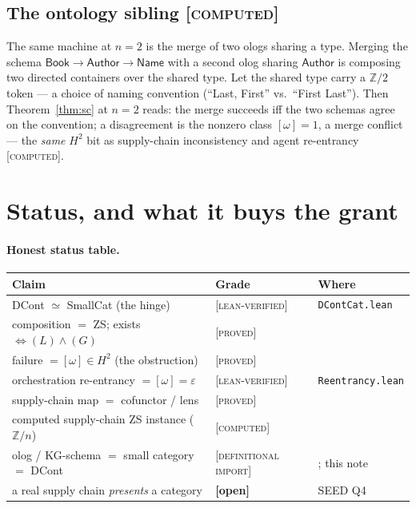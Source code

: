 \documentclass[11pt]{article}
\theoremstyle{definition}
\newcommand{\Zn}{\mathbb{Z}/n}
\newcommand{\Ztwo}{\mathbb{Z}/2}
\newcommand{\gLean}{\textsc{[lean-verified]}}
\newcommand{\gProved}{\textsc{[proved]}}
\newcommand{\gComputed}{\textsc{[computed]}}
\newcommand{\gImport}{\textsc{[definitional import]}}
\newcommand{\gOpen}{\textbf{[open]}}
\begin{document}
\subsection{The ontology sibling \gComputed}
The same machine at $n=2$ is the merge of two ologs sharing a type. Merging the schema
$\mathsf{Book}\to\mathsf{Author}\to\mathsf{Name}$ with a second olog sharing
$\mathsf{Author}$ is composing two directed containers over the shared type. Let the shared
type carry a $\Ztwo$ token --- a choice of naming convention (``Last, First'' vs.\ ``First
Last''). Then Theorem~\ref{thm:sc} at $n=2$ reads: the merge succeeds iff the two schemas
agree on the convention; a disagreement is the nonzero class $[\omega]=1$, a merge conflict
--- the \emph{same} $H^2$ bit as supply-chain inconsistency and agent re-entrancy
\gComputed.

\section{Status, and what it buys the grant}\label{sec:status}

\paragraph{Honest status table.}
\begin{center}
\begin{tabular}{@{}lll@{}}
\toprule
Claim & Grade & Where \\
\midrule
DCont $\simeq$ SmallCat (the hinge) & \gLean & \texttt{DContCat.lean} \cite{au-dccat} \\
composition $=$ ZS; exists $\iff (L)\wedge(G)$ & \gProved & \cite{pairwise} \\
failure $=[\omega]\in H^2$ (the obstruction) & \gProved & \cite{gobstr} \\
orchestration re-entrancy $=[\omega]=\varepsilon$ & \gLean & \texttt{Reentrancy.lean} \cite{orch} \\
supply-chain map $=$ cofunctor / lens & \gProved & \cite{coflens} \\
computed supply-chain ZS instance ($\Zn$) & \gComputed & \cite{supplyzs} \\
olog / KG-schema $=$ small category $=$ DCont & \gImport & \cite{spivak-ologs}; this note \\
a real supply chain \emph{presents} a category & \gOpen & SEED Q4 \\
\bottomrule
\end{tabular}
\end{center}
\end{document}
